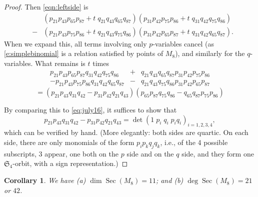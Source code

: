\documentclass{amsart}
\newcommand{\cut}[1]{}
\newtheorem{corollary}[theorem]{Corollary}
\theoremstyle{definition}
\theoremstyle{remark}
\newtheorem{remark}[theorem]{\it Remark}
\DeclareMathOperator{\Sec}{Sec}
\def\SS{\mathfrak{S}}
\def\cubic{\mathcal{C}}
\begin{document}
{\begin{proof}
Then \eqref{eqn:leftside} is
\begin{eqnarray*} & &  (p_{21} p_{43} p_{65} p_{87} + t \;  q_{21} q_{43}
  q_{65} q_{87})  (p_{31} p_{42} p_{75} p_{86} + t \; q_{31} q_{42} q_{75}
  q_{86}) \\ &-& (p_{21} p_{43} p_{75} p_{86}  + t \;  q_{21} q_{43} q_{75} q_{86} )
  (p_{31} p_{42} p_{65} p_{87} + t \; q_{31} q_{42} q_{65} q_{87}).\end{eqnarray*}
When we expand this, all terms involving only $p$-variables cancel
(as \eqref{e:simplebinomial} is a relation satisfied by points of
$M_8$), and similarly for the $q$-variables.
What remains is $t$ times
\begin{eqnarray*}
 p_{21} p_{43} p_{65} p_{87}  q_{31} q_{42} q_{75} q_{86}
&+& q_{21} q_{43} q_{65} q_{87} p_{31} p_{42} p_{75} p_{86} \\
 -
p_{21} p_{43} p_{75} p_{86}   q_{31} q_{42} q_{65} q_{87}
&-& q_{21} q_{43} q_{75} q_{86} p_{31} p_{42} p_{65} p_{87}\end{eqnarray*}
$$= (p_{21} p_{43} q_{31} q_{42} - p_{31} p_{42} q_{21} q_{43}) (p_{65} p_{87} q_{75} q_{86} -
q_{65} q_{87} p_{75} p_{86})
$$

By comparing this to \eqref{eq:july16},
it suffices to show that 
$$p_{21} p_{43} q_{31} q_{42} - p_{31} p_{42} q_{21} q_{43}
=
\det ( 1 \;    p_i  \;     q_i  \;    p_iq_i)_{i=1,2,3,4},$$
which can be verified by hand.
(More elegantly: both sides are quartic.  On each side, there are
 only monomials of the form $p_i p_k q_j q_k$, i.e., of the 4 possible
 subscripts, 3 appear, one both
on the $p$ side and on the $q$ side, and they form one $\SS_4$-orbit,
with a sign representation.)
\end{proof}
}

\cut {
\begin{remark}
It may appear that we needed the explicit
equation of $\cubic$ of Remark~\ref{r:explicit} for this proof.
But in fact we need only know that the partial derivatives of $\cubic$
(as an $\SS_8$-representation) are the same as the  simple binomial
quadratic relations, which is true as the quadratic relations form an
irreducible $\SS_8$-representation 
(Proposition~\ref{prop:decomp}).
\end{remark}
}


\begin{corollary}
We have (a) $\dim \Sec(M_8) = 11$; and (b) $\deg \Sec(M_8) = 21$ or $42$.\label{c:2142}
\end{corollary}
\end{document}
